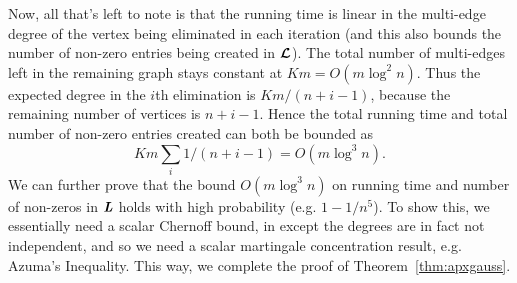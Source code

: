 Now, all that's left to note is that the running time is linear in the
multi-edge degree of the vertex being eliminated in each iteration (and
this also bounds the number of non-zero entries being created in
$\boldsymbol{\mathit{{\mathcal{L}}}}$).
The total number of multi-edges left in the remaining graph stays
constant at $K m = O(m\log^2 n)$.
Thus the expected degree in the $i$th elimination is $K m/(n+i-1)$,
because the remaining number of vertices is $n+i-1$.
Hence the total running time and total number of non-zero entries
created can both be bounded as
\[
  Km\sum_i 1/(n+i-1) = O(m\log^3 n)
  .
  \]
We can further prove that the bound $O(m\log^3 n)$ on running time and
number of non-zeros in $\boldsymbol{\mathit{L}}$ holds with high probability
(e.g. $1-1/n^5$).
To show this, we essentially need a scalar Chernoff bound, in except
the degrees are in fact not independent, and so we need a scalar
martingale concentration result, e.g. Azuma's Inequality.
This way, we complete the proof of Theorem~\ref{thm:apxgauss}.
\FloatBarrier

%
%


